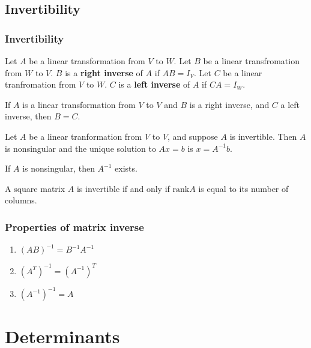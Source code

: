 \documentclass[compress]{beamer}
\newcommand{\rank}{\mathrm{rank}}
\theoremstyle{definition}
\begin{document}
\subsection{Invertibility}

\begin{frame}
  \frametitle{Invertibility}
  \begin{definition}
    Let $A$ be a linear transformation from $V$ to $W$. Let $B$ be a
    linear transfromation from $W$ to $V$. $B$ is a \textbf{right
      inverse} of $A$ if $AB = I_V$. Let $C$ be a linear tranfromation
    from $V$ to $W$. $C$ is a \textbf{left inverse} of $A$ if $CA = I_W$. 
  \end{definition}  
  
  \begin{lemma}
    If $A$ is a linear transformation from $V$ to $V$ and $B$ is a right
    inverse, and $C$ a left inverse, then $B = C$. 
  \end{lemma}
\end{frame}

\begin{frame}
  \begin{lemma}
    Let $A$ be a linear tranformation from $V$ to $V$, and suppose $A$
    is invertible. Then $A$ is nonsingular and the unique solution to
    $Ax = b$ is $x = A^{-1} b$. 
  \end{lemma}

  \begin{lemma}
    If $A$ is nonsingular, then $A^{-1}$ exists.
  \end{lemma}

  \begin{corollary}
    A square matrix $A$ is invertible if and only if $\rank A$ is
    equal to its number of columns.
  \end{corollary}
\end{frame}

\begin{frame}
  \frametitle{Properties of matrix inverse}
  \begin{enumerate}
  \item $(AB)^{-1} = B^{-1} A^{-1}$
  \item $(A^T)^{-1} = (A^{-1})^T$
  \item $(A^{-1})^{-1} = A$
  \end{enumerate}
\end{frame}

\section{Determinants}
\end{document}
